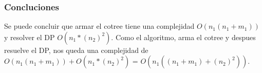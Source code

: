     \subsubsection{Concluciones}
    
    Se puede concluir que armar el cotree tiene una complejidad $O(n_1(n_1 + m_1))$ y resolver el DP $O(n_1 * (n_2)^2 )$.
    Como el algoritmo, arma el cotree y despues resuelve el DP, nos queda una complejidad de $O(n_1(n_1 + m_1)) + O(n_1 * (n_2)^2 )$ = $O(n_1((n_1 + m_1) + (n_2)^2 ))$.





   














